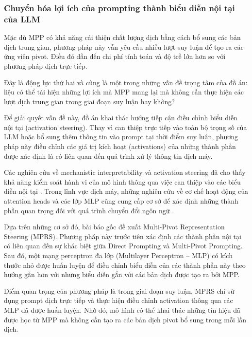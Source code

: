 \subsubsection{Chuyển hóa lợi ích của prompting thành biểu diễn nội tại của LLM}

Mặc dù MPP có khả năng cải thiện chất lượng dịch bằng cách bổ sung các bản dịch trung gian, phương pháp này vẫn yêu cầu nhiều lượt suy luận để tạo ra các ứng viên pivot. Điều đó dẫn đến chi phí tính toán và độ trễ lớn hơn so với phương pháp dịch trực tiếp.

Đây là động lực thứ hai và cũng là một trong những vấn đề trọng tâm của đồ án: liệu có thể tái hiện những lợi ích mà MPP mang lại mà không cần thực hiện các lượt dịch trung gian trong giai đoạn suy luận hay không?

Để giải quyết vấn đề này, đồ án khai thác hướng tiếp cận điều chỉnh biểu diễn nội tại (activation steering). Thay vì can thiệp trực tiếp vào toàn bộ trọng số của LLM hoặc bổ sung thêm thông tin vào prompt tại thời điểm suy luận, phương pháp này điều chỉnh các giá trị kích hoạt (activations) của những thành phần được xác định là có liên quan đến quá trình xử lý thông tin dịch máy.

Các nghiên cứu về mechanistic interpretability và activation steering đã cho thấy khả năng kiểm soát hành vi của mô hình thông qua việc can thiệp vào các biểu diễn nội tại \cite{rimsky-etal-2024-steering,li2023inference,zou2023representation}. Trong lĩnh vực dịch máy, những nghiên cứu về cơ chế hoạt động của attention heads và các lớp MLP cũng cung cấp cơ sở để xác định những thành phần quan trọng đối với quá trình chuyển đổi ngôn ngữ \cite{zhang2026exploring}.

Dựa trên những cơ sở đó, bài báo gốc đề xuất Multi-Pivot Representation Steering (MPRS). Phương pháp này trước tiên xác định các thành phần nội tại có liên quan đến sự khác biệt giữa Direct Prompting và Multi-Pivot Prompting. Sau đó, một mạng perceptron đa lớp (Multilayer Perceptron -- MLP) có kích thước nhỏ được huấn luyện để điều chỉnh biểu diễn của các thành phần này theo hướng gần hơn với những biểu diễn gắn với các bản dịch được tạo ra bởi MPP.

Điểm quan trọng của phương pháp là trong giai đoạn suy luận, MPRS chỉ sử dụng prompt dịch trực tiếp và thực hiện điều chỉnh activation thông qua các MLP đã được huấn luyện. Nhờ đó, mô hình có thể khai thác những tín hiệu đã được học từ MPP mà không cần tạo ra các bản dịch pivot bổ sung trong mỗi lần dịch.


